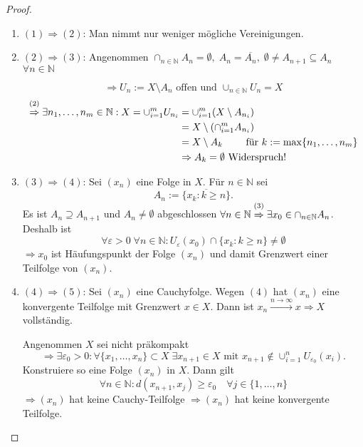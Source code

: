 \documentclass[ngerman]{report}
\theoremstyle{plain}%
\theoremstyle{definition}%
\theoremstyle{myStyle}
\newcommand{\N}{\mathbb{N}}
\newcommand{\df}[1][]{%
	\overset{#1}{\Rightarrow}
}
\begin{document}
\begin{proof}
\begin{enumerate}[]
	\item $(1) \df (2)$: Man nimmt nur weniger mögliche Vereinigungen.
	
	\item $(2) \df (3)$: Angenommen $\cap_{n\in\N}{A_n} = \emptyset,\;A_n = \overline{A_n},\;\emptyset \not = A_{n+1} \subseteq A_n$ $\forall n\in\N$\par
	$$\df U_n := X\setminus A_n \text{ offen und }\cup_{n\in\N} U_n = X$$
	\begin{equation*}
	\begin{split}
		\overset{(2)}{\df} \exists n_1,\dots,n_m\in\N : X = \cup^m_{i=1} U_{n_i} & = \cup^m_{i=1} (X\setminus A_{n_i}) 
		\\ & = X \setminus (\cap^m_{i=1} A_{n_i})
		\\ & = X \setminus A_k\qquad \text{ für } k := \max \{n_1,\dots,n_m\}
		\\ & \df A_k = \emptyset \text{ Widerspruch!}
	\end{split}
	\end{equation*}
	
	\item $(3) \df (4)$: Sei $(x_n)$ eine Folge in  $X$. Für $n\in\N$ sei $$A_n:=\overline{\{x_k : k \geq n\}}.$$ 
	Es ist $A_n \supseteq A_{n+1}$ und $A_n \not= \emptyset$ abgeschlossen $\forall n\in\N \overset{(3)}{\df} \exists x_0 \in \cap_{n\in\N} A_n$. 
	Deshalb ist 
	$$\forall \varepsilon > 0 \;\forall n\in\N:U_\varepsilon (x_0) \cap \{x_k : k \geq n \} \not = \emptyset$$ 
	$\df x_0$ ist Häufungspunkt der Folge $(x_n)$ und damit Grenzwert einer Teilfolge von $(x_n)$.
	\item $(4) \df (5)$: Sei $(x_n)$ eine Cauchyfolge. Wegen $(4)$ hat $(x_n)$ eine konvergente Teilfolge mit Grenzwert $x\in X$. 
	Dann ist $x_n\overset{n\to\infty}{\longrightarrow} x \df X$ vollständig.\par 
	Angenommen $X$ sei nicht präkompakt 
	$$\Rightarrow \exists
	\varepsilon_0 > 0 : \forall\{x_1,\dots,x_n\}\subset X \;\exists x_{n+1} 
	\in X \text{ mit }x_{n+1} \not \in \cup^n_{i=1} U_{\varepsilon_0}(x_i).$$
	Konstruiere so eine Folge $(x_n)$ in $X$. Dann gilt 
	$$\forall n\in\N: d(x_{n+1},x_j) \geq \varepsilon_0\quad \forall j \in \{1,\dots,n\}$$
	$\df (x_n)$ hat keine Cauchy-Teilfolge $\df (x_n)$ hat keine konvergente Teilfolge.
\end{enumerate}
\end{proof}
\end{document}
